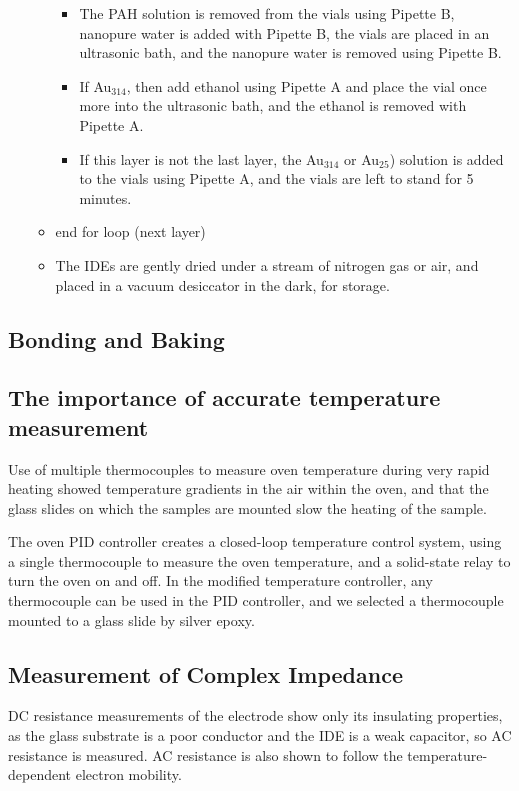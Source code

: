 \documentclass[12pt,oneside,english]{article}
\begin{document}
\begin{itemize}
\begin{itemize}
\begin{itemize}
				\item The PAH solution is removed from the vials using Pipette B,  nanopure water is added with Pipette B, the vials are placed in an ultrasonic bath, and the nanopure water is removed using Pipette B.
				\item If Au$_{314}$, then add ethanol using Pipette A and place the vial once more into the ultrasonic bath, and the ethanol is removed with Pipette A.
				\item If this layer is not the last layer, the Au$_{314}$ or Au$_{25}$) solution is added to the vials using Pipette A, and the vials are left to stand for 5 minutes.
			\end{itemize}
			\item end for loop (next layer)
			\item The IDEs are gently dried under a stream of nitrogen gas or air, and placed in a vacuum desiccator in the dark, for storage.
		\end{itemize}
	\end{itemize}

	\subsection{Bonding and Baking}
	
	\subsection{The importance of accurate temperature measurement}
	Use of multiple thermocouples to measure oven temperature during very rapid heating showed temperature gradients in the air within the oven, and that the glass slides on which the samples are mounted slow the heating of the sample.
	
	The oven PID controller creates a closed-loop temperature control system, using a single thermocouple to measure the oven temperature, and a solid-state relay to turn the oven on and off. 
	In the modified temperature controller, any thermocouple can be used in the PID controller, and we selected a thermocouple mounted to a glass slide by silver epoxy.
	
	
	
	\subsection{Measurement of Complex Impedance}
	DC resistance measurements of the electrode show only its insulating properties, as the glass substrate is a poor conductor and the IDE is a weak capacitor, so AC resistance is measured.
	AC resistance is also shown to follow the temperature-dependent electron mobility.
	
\end{document}
